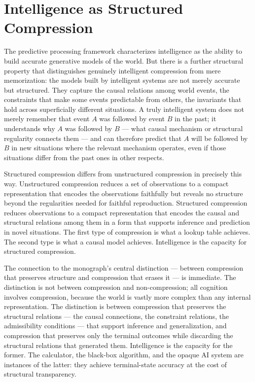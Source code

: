 \documentclass[12pt,openany]{book}
\theoremstyle{plain}
\theoremstyle{definition}
\theoremstyle{remark}
\begin{document}
\section{Intelligence as Structured Compression}

The predictive processing framework characterizes intelligence as the ability to build accurate generative models of the world. But there is a further structural property that distinguishes genuinely intelligent compression from mere memorization: the models built by intelligent systems are not merely accurate but structured. They capture the causal relations among world events, the constraints that make some events predictable from others, the invariants that hold across superficially different situations. A truly intelligent system does not merely remember that event $A$ was followed by event $B$ in the past; it understands why $A$ was followed by $B$ — what causal mechanism or structural regularity connects them — and can therefore predict that $A$ will be followed by $B$ in new situations where the relevant mechanism operates, even if those situations differ from the past ones in other respects.

Structured compression differs from unstructured compression in precisely this way. Unstructured compression reduces a set of observations to a compact representation that encodes the observations faithfully but reveals no structure beyond the regularities needed for faithful reproduction. Structured compression reduces observations to a compact representation that encodes the causal and structural relations among them in a form that supports inference and prediction in novel situations. The first type of compression is what a lookup table achieves. The second type is what a causal model achieves. Intelligence is the capacity for structured compression.

The connection to the monograph's central distinction — between compression that preserves structure and compression that erases it — is immediate. The distinction is not between compression and non-compression; all cognition involves compression, because the world is vastly more complex than any internal representation. The distinction is between compression that preserves the structural relations — the causal connections, the constraint relations, the admissibility conditions — that support inference and generalization, and compression that preserves only the terminal outcomes while discarding the structural relations that generated them. Intelligence is the capacity for the former. The calculator, the black-box algorithm, and the opaque AI system are instances of the latter: they achieve terminal-state accuracy at the cost of structural transparency.
\end{document}
